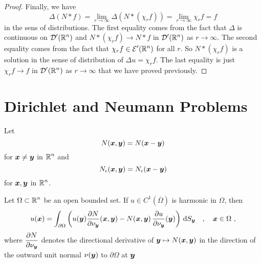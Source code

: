 \begin{proof}
Finally, we have
\[
\Delta (N\ast f) = \lim_{r\to \infty} \Delta (N \ast (\chi_r f))
= \lim_{r\to \infty} \chi_r f = f
\]
in the sens of distributions.  The first equality comes from the fact
that $\Delta$ is continuous on $\displaystyle \mathcal{D}'(\mathbb{R}^n)$ and
$N\ast (\chi_r f) \to N \ast f$ in $\displaystyle \mathcal{D}'(\mathbb{R}^n)$ as
$r \to \infty$.  The second equality comes from the fact that
$\displaystyle \chi_r f \in \mathcal{E}'(\mathbb{R}^n)$ for all $r$.
So $N \ast (\chi_r f)$ is a
solution in the sense of distribution of $\Delta u = \chi_r f$.
The last equality is just $\chi_r f \to f$ in
$\displaystyle \mathcal{D}'(\mathbb{R}^n)$ as $r\to \infty$ that we have proved previously.
\end{proof}

\section{Dirichlet and Neumann Problems}

Let
\begin{equation} \label{laplace_NXY}
N({\bm{x}},{\bm{y}}) = N({\bm{x}}-{\bm{y}})
\end{equation}
for ${\bm{x}}\neq {\bm{y}}$ in $\displaystyle \mathbb{R}^n$ and
\[
  N_\epsilon({\bm{x}},{\bm{y}}) = N_\epsilon({\bm{x}}-{\bm{y}})
\]
for ${\bm{x}},{\bm{y}}$ in $\displaystyle \mathbb{R}^n$.

\begin{theorem} \label{laplace_uhexp}
Let $\displaystyle \Omega \subset \mathbb{R}^n$ be an open bounded set.  If
$\displaystyle u\in C^1(\overline{\Omega})$ is harmonic in $\Omega$, then
\begin{equation} \label{laplace_pot3}
u({\bm{x}}) = \int_{\partial \Omega} \left( u({\bm{y}})
\frac{\partial{N}}{\partial \nu_{{\bm{y}}}}({\bm{x}},{\bm{y}}) -
N({\bm{x}},{\bm{y}})\,\frac{\partial{u}}{\partial \nu_{{\bm{y}}}}({\bm{y}})\right)
\,\mathrm{d}{S}_{{\bm{y}}} \quad , \quad {\bm{x}} \in \Omega \ ,
\end{equation}
where $\displaystyle \frac{\partial{N}}{\partial \nu_{{\bm{y}}}}$ denotes the
directional derivative of ${\bm{y}} \mapsto N({\bm{x}},{\bm{y}})$ in the
direction of the outward unit normal $\nu({\bm{y}})$ to
$\partial \Omega$ at ${\bm{y}}$
\end{theorem}

